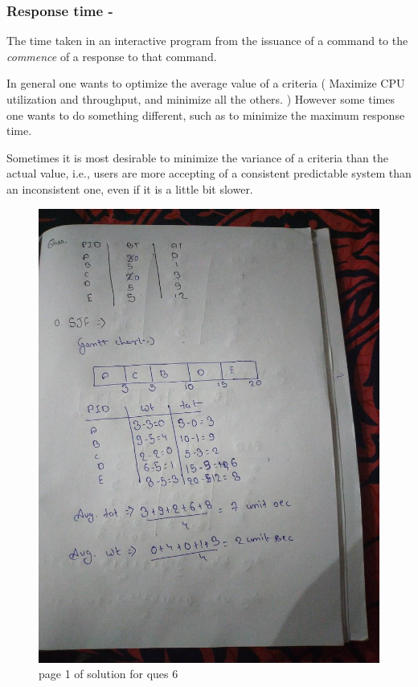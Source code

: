 \documentclass[11pt,a4paper,oneside]{article}
\begin{document}
\subsubsection{Response time - }
The time taken in an interactive program from the issuance of a command to the \emph{commence} of a response to that command.

\vskip 1cm

In general one wants to optimize the average value of a criteria ( Maximize CPU utilization and throughput, and minimize all the others. ) However some times one wants to do something different, such as to minimize the maximum response time.

Sometimes it is most desirable to minimize the \textmd{variance} of a criteria than the actual value, i.e., users are more accepting of a consistent predictable system than an inconsistent one, even if it is a little bit slower.

\vskip 1cm

\begin{figure}[hbt!]
	\centering
	\includegraphics[width=1\textwidth, angle=-90]{images/red_images/q6i1.jpg}
	\caption{page 1 of solution for ques 6}
\end{figure}
\end{document}
